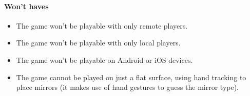 \paragraph{Won't haves}
\begin{itemize}
	\item The game won't be playable with only remote players.
	\item The game won't be playable with only local players.
	\item The game won't be playable on Android or iOS devices.
	\item The game cannot be played on just a flat surface, using hand tracking to place mirrors (it makes use of hand gestures to guess the mirror type).
\end{itemize}